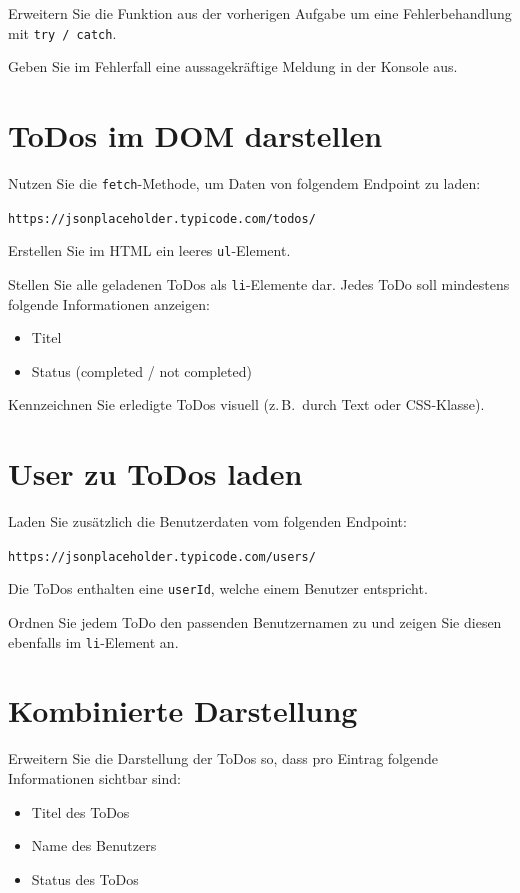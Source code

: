 \documentclass[a4paper,12pt]{article}
\begin{document}
Erweitern Sie die Funktion aus der vorherigen Aufgabe um eine Fehlerbehandlung mit \texttt{try / catch}.

Geben Sie im Fehlerfall eine aussagekräftige Meldung in der Konsole aus.

\section{ToDos im DOM darstellen}

Nutzen Sie die \texttt{fetch}-Methode, um Daten von folgendem Endpoint zu laden:

\texttt{https://jsonplaceholder.typicode.com/todos/}

Erstellen Sie im HTML ein leeres \texttt{ul}-Element.

Stellen Sie alle geladenen ToDos als \texttt{li}-Elemente dar.
Jedes ToDo soll mindestens folgende Informationen anzeigen:

\begin{itemize}
    \item Titel
    \item Status (completed / not completed)
\end{itemize}

Kennzeichnen Sie erledigte ToDos visuell (z.\,B.\ durch Text oder CSS-Klasse).

\section{User zu ToDos laden}

Laden Sie zusätzlich die Benutzerdaten vom folgenden Endpoint:

\texttt{https://jsonplaceholder.typicode.com/users/}

Die ToDos enthalten eine \texttt{userId}, welche einem Benutzer entspricht.

Ordnen Sie jedem ToDo den passenden Benutzernamen zu und zeigen Sie diesen ebenfalls im \texttt{li}-Element an.

\section{Kombinierte Darstellung}

Erweitern Sie die Darstellung der ToDos so, dass pro Eintrag folgende Informationen sichtbar sind:

\begin{itemize}
    \item Titel des ToDos
    \item Name des Benutzers
    \item Status des ToDos
\end{itemize}
\end{document}
